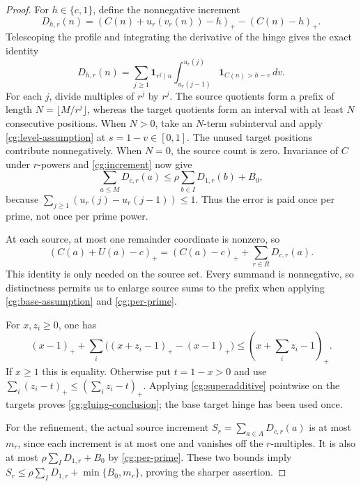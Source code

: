 \begin{proof}
For $h\in\{c,1\}$, define the nonnegative increment
\[
 D_{h,r}(n)=(C(n)+u_r(v_r(n))-h)_+-(C(n)-h)_+.
\]
Telescoping the profile and integrating the derivative of the hinge
gives the exact identity
\begin{equation}
 D_{h,r}(n)=\sum_{j\ge1}\mathbf1_{r^j\mid n}
  \int_{u_r(j-1)}^{u_r(j)}\mathbf1_{C(n)>h-v}\,dv.
 \label{cg:increment}
\end{equation}
For each $j$, divide multiples of $r^j$ by $r^j$. The source
quotients form a prefix of length $N=\lfloor M/r^j\rfloor$,
whereas the target quotients form an interval with at least $N$
consecutive positions. When $N>0$, take an $N$-term subinterval
and apply \eqref{cg:level-assumption} at $s=1-v\in[0,1]$.
The unused target positions contribute nonnegatively. When $N=0$,
the source count is zero. Invariance of $C$ under $r$-powers and
\eqref{cg:increment} now give
\begin{equation}
 \sum_{a\le M}D_{c,r}(a)
 \le\rho\sum_{b\in I}D_{1,r}(b)+B_0,
 \label{cg:per-prime}
\end{equation}
because $\sum_{j\ge1}(u_r(j)-u_r(j-1))\le1$.
Thus the error is paid once per prime, not once per prime power.

At each source, at most one remainder coordinate is nonzero, so
\begin{equation}
 (C(a)+U(a)-c)_+=(C(a)-c)_++\sum_{r\in R}D_{c,r}(a).
 \label{cg:source-identity}
\end{equation}
This identity is only needed on the source set. Every summand is
nonnegative, so distinctness permits us to enlarge source sums to the
prefix when applying \eqref{cg:base-assumption} and
\eqref{cg:per-prime}.

For $x,z_i\ge0$, one has
\begin{equation}
 (x-1)_++\sum_i\bigl((x+z_i-1)_+-(x-1)_+\bigr)
 \le\left(x+\sum_i z_i-1\right)_+.
 \label{cg:superadditive}
\end{equation}
If $x\ge1$ this is equality. Otherwise put $t=1-x>0$ and use
$\sum_i(z_i-t)_+\le(\sum_i z_i-t)_+$. Applying
\eqref{cg:superadditive} pointwise on the targets proves
\eqref{cg:gluing-conclusion}; the base target hinge has been used once.

For the refinement, the actual source increment
$S_r=\sum_{a\in A}D_{c,r}(a)$ is at most $m_r$, since each
increment is at most one and vanishes off the $r$-multiples.
It is also at most $\rho\sum_I D_{1,r}+B_0$ by
\eqref{cg:per-prime}. These two bounds imply
$S_r\le\rho\sum_I D_{1,r}+\min\{B_0,m_r\}$, proving the
sharper assertion.
\end{proof}

